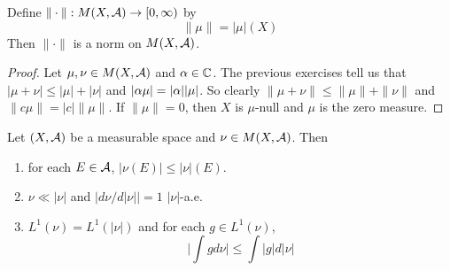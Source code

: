 \documentclass{book}
\begin{document}
	\begin{ex}  
	Define $\|\cdot \|: M(X, \mathcal{A}) \rightarrow [0,\infty)$ by $$\|\mu \|= | \mu | (X)$$ 
	Then $\|\cdot \|$ is a norm on $M(X, \mathcal{A})$. 
	\end{ex}
	
	\begin{proof}
		Let $\mu, \nu \in M(X, \mathcal{A})$ and $\alpha \in \mathbb{C}$. The previous exercises tell us that $| \mu + \nu | \leq | \mu | + | \nu |$ and $| \alpha \mu | = | \alpha | | \mu |$. So clearly $\|\mu + \nu \|\leq \|\mu \|+ \|\nu \|$ and $\|c \mu \|= | c | \|\mu \|$. If $\|\mu \|= 0$, then $X$ is $\mu$-null and $\mu$ is the zero measure.
	\end{proof}
	
	\begin{ex}  
		Let $(X, \mathcal{A})$ be a measurable space and $\nu \in M(X, \mathcal{A})$. Then 
		
		\begin{enumerate}
			\item for each $E \in \mathcal{A}$, $|\nu(E)| \leq |\nu|(E)$. 
			\item $\nu \ll |\nu|$ and $\big|d \nu /d |\nu|\big| = 1$ $|\nu|$-a.e.
			\item $L^1(\nu) = L^1(|\nu|)$ and for each $g \in L^1(\nu)$, $$ \bigg|\int g d\nu \bigg| \leq \int |g|d |\nu|$$
		\end{enumerate}
	\end{ex}
	
\end{document}

